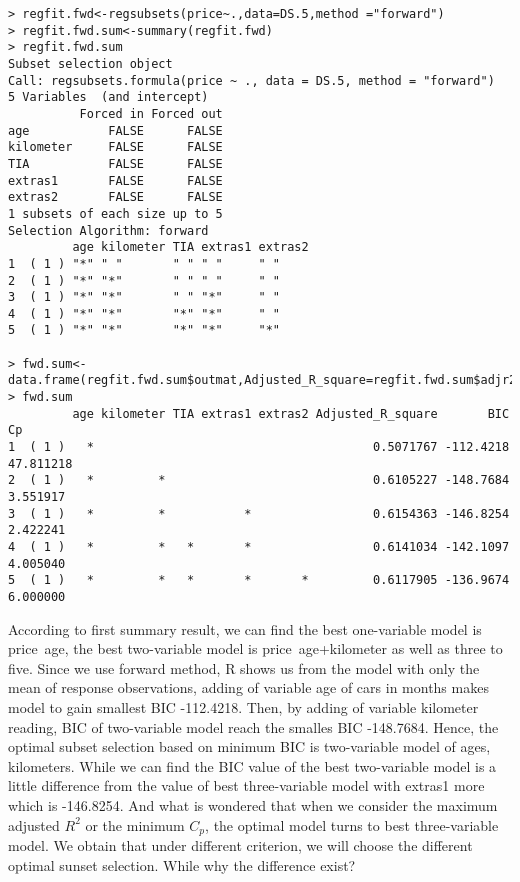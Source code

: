 \documentclass[a4paper]{article}
\begin{document}
\begin{verbatim}
> regfit.fwd<-regsubsets(price~.,data=DS.5,method ="forward")
> regfit.fwd.sum<-summary(regfit.fwd)
> regfit.fwd.sum
Subset selection object
Call: regsubsets.formula(price ~ ., data = DS.5, method = "forward")
5 Variables  (and intercept)
          Forced in Forced out
age           FALSE      FALSE
kilometer     FALSE      FALSE
TIA           FALSE      FALSE
extras1       FALSE      FALSE
extras2       FALSE      FALSE
1 subsets of each size up to 5
Selection Algorithm: forward
         age kilometer TIA extras1 extras2
1  ( 1 ) "*" " "       " " " "     " "    
2  ( 1 ) "*" "*"       " " " "     " "    
3  ( 1 ) "*" "*"       " " "*"     " "    
4  ( 1 ) "*" "*"       "*" "*"     " "    
5  ( 1 ) "*" "*"       "*" "*"     "*"    

> fwd.sum<-data.frame(regfit.fwd.sum$outmat,Adjusted_R_square=regfit.fwd.sum$adjr2,BIC=regfit.fwd.sum$bic,Cp=regfit.fwd.sum$cp)
> fwd.sum
         age kilometer TIA extras1 extras2 Adjusted_R_square       BIC        Cp
1  ( 1 )   *                                       0.5071767 -112.4218 47.811218
2  ( 1 )   *         *                             0.6105227 -148.7684  3.551917
3  ( 1 )   *         *           *                 0.6154363 -146.8254  2.422241
4  ( 1 )   *         *   *       *                 0.6141034 -142.1097  4.005040
5  ( 1 )   *         *   *       *       *         0.6117905 -136.9674  6.000000 
\end{verbatim}

\noindent
According to first summary result, we can find the best one-variable model is price~age, the best two-variable model is price~age+kilometer as well as three to five. Since we use forward method, R shows us from the model with only the mean of response observations, adding of variable age of cars in months makes model to gain smallest BIC -112.4218. Then, by adding of variable kilometer reading, BIC of two-variable model reach the smalles BIC -148.7684. Hence, the optimal subset selection based on minimum BIC is two-variable model of ages, kilometers. While we can find the BIC value of the best two-variable model is a little difference from the value of best three-variable model with extras1 more which is -146.8254. And what is wondered that when we consider the maximum adjusted $R^2$ or the minimum $C_p$, the optimal model turns to best three-variable model. We obtain that under different criterion, we will choose the different optimal sunset selection. While why the difference exist? \\
\end{document}
